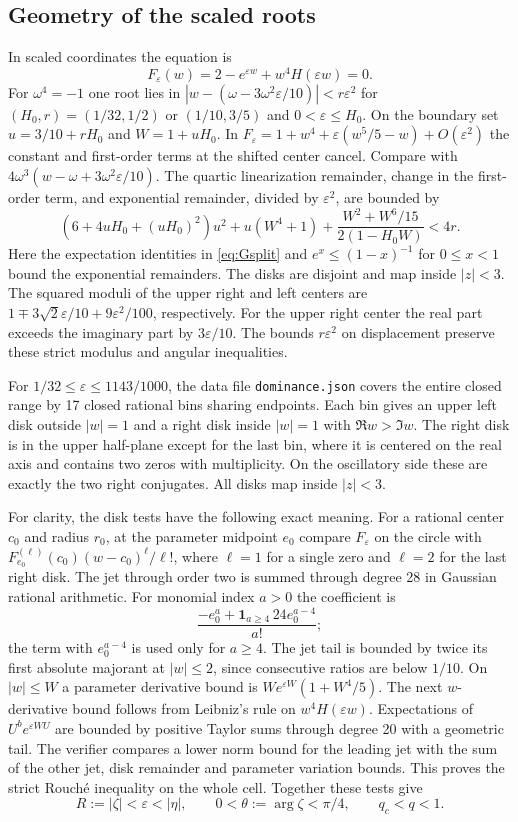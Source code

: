 \documentclass[11pt]{article}
\newcommand{\e}{\varepsilon}
\begin{document}
\subsection{Geometry of the scaled roots}\label{sec:boxes}
In scaled coordinates the equation is
\[
 F_{\e}(w)=2-e^{\e w}+w^4H(\e w)=0.
\]
For $\omega^4=-1$ one root lies in
$|w-(\omega-3\omega^2\e/10)|<r\e^2$
for $(H_0,r)=(1/32,1/2)$ or $(1/10,3/5)$ and $0<\e\le H_0$.
On the boundary set $u=3/10+rH_0$ and $W=1+uH_0$.
In $F_{\e}=1+w^4+\e(w^5/5-w)+O(\e^2)$ the constant and
first-order terms at the shifted center cancel. Compare with
$4\omega^3(w-\omega+3\omega^2\e/10)$. The quartic
linearization remainder, change in the first-order term, and
exponential remainder, divided by $\e^2$, are bounded by
\begin{equation}\label{eq:disk-small}
 (6+4uH_0+(uH_0)^2)u^2+u(W^4+1)
    +\frac{W^2+W^6/15}{2(1-H_0W)}<4r.
\end{equation}
Here the expectation identities in \eqref{eq:Gsplit} and
$e^x\le(1-x)^{-1}$ for $0\le x<1$ bound the exponential
remainders. The disks are disjoint and map inside $|z|<3$.
The squared moduli of the upper right and left centers are
$1\mp 3\sqrt2\e/10+9\e^2/100$, respectively.
For the upper right center the real part exceeds the imaginary
part by $3\e/10$. The bounds $r\e^2$ on displacement preserve
these strict modulus and angular inequalities.

For $1/32\le\e\le1143/1000$, the data file
\texttt{dominance.json} covers the entire closed range by 17
closed rational bins sharing endpoints. Each bin gives an upper left disk
outside $|w|=1$ and a right disk inside $|w|=1$ with
$\Re w>\Im w$. The right disk is in the upper half-plane except
for the last bin, where it is centered on the real axis and
contains two zeros with multiplicity. On the oscillatory side
these are exactly the two right conjugates. All disks map
inside $|z|<3$.

For clarity, the disk tests have the following exact meaning.
For a rational center $c_0$ and radius $r_0$, at the parameter
midpoint $e_0$ compare $F_\e$ on the circle with
$F_{e_0}^{(\ell)}(c_0)(w-c_0)^\ell/\ell!$, where $\ell=1$
for a single zero and $\ell=2$ for the last right disk.
The jet through order two is summed through degree 28 in
Gaussian rational arithmetic. For monomial index $a>0$ the
coefficient is
\[
 \frac{-e_0^a+\mathbf1_{a\ge4}\,24e_0^{a-4}}{a!};
\]
the term with $e_0^{a-4}$ is used only for $a\ge4$.
The jet tail is bounded by twice its first absolute majorant
at $|w|\le2$, since consecutive ratios are below $1/10$.
On $|w|\le W$ a parameter derivative bound is
$W e^{\e W}(1+W^4/5)$. The next $w$-derivative
bound follows from Leibniz's rule on $w^4H(\e w)$.
Expectations of $U^b e^{\e W U}$ are bounded by positive
Taylor sums through degree 20 with a geometric tail.
The verifier compares a lower norm bound for the leading jet
with the sum of the other jet, disk remainder and parameter
variation bounds. This proves the strict Rouch\'e inequality
on the whole cell. Together these tests give
\begin{equation}\label{eq:geometry}
 R:=|\zeta|<\e<|\eta|,\qquad
 0<\theta:=\arg\zeta<\pi/4 ,\qquad q_c<q<1.
\end{equation}
\end{document}
